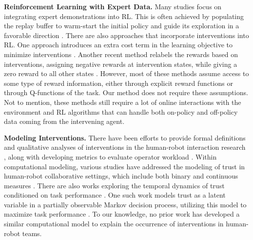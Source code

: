     \noindent\textbf{Reinforcement Learning with Expert Data.} Many studies focus on integrating expert demonstrations into RL. This is often achieved by populating the replay buffer to warm-start the initial policy and guide its exploration in a favorable direction \cite{hester2018deep, ball2023efficient, nair2018overcoming, xie2021policy}. There are also approaches that incorporate interventions into RL. One approach introduces an extra cost term in the learning objective to minimize interventions \cite{li2022efficient}. Another recent method relabels the rewards based on interventions, assigning negative rewards at intervention states, while giving a zero reward to all other states \cite{luo2023rlif}. However, most of these methods assume access to some type of reward information, either through explicit reward functions or through Q-functions of the task. Our method does not require these assumptions. Not to mention, these methods still require a lot of online interactions with the environment and RL algorithms that can handle both on-policy and off-policy data coming from the intervening agent.

    \noindent\textbf{Modeling Interventions.} There have been efforts to provide formal definitions and qualitative analyses of interventions in the human-robot interaction research \cite{wang2025effects}, along with developing metrics to evaluate operator workload \cite{scholtz2003theory, steinfeld2006common}. Within computational modeling, various studies have addressed the modeling of trust in human-robot collaborative settings, which include both binary and continuous measures \cite{rodriguez2023review}. There are also works exploring the temporal dynamics of trust conditioned on task performance \cite{guo2021modeling, chen2018planning}. One such work models trust as a latent variable in a partially observable Markov decision process, utilizing this model to maximize task performance \cite{chen2018planning}. To our knowledge, no prior work has developed a similar computational model to explain the occurrence of interventions in human-robot teams.